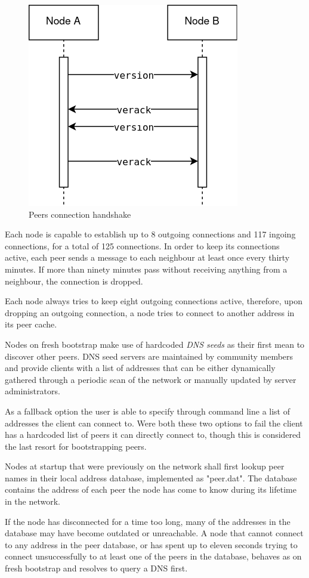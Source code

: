 \begin{figure}[h]
	\includegraphics[width=.45\textwidth]{pict/BTCconnection.png}
	\centering
	\caption{Peers connection handshake}
	\label{fig:btcconn}
\end{figure}

Each node is capable to establish up to 8 outgoing connections and 117 ingoing connections, for a total of 125 connections. In order to keep its connections active, each peer sends a message to each neighbour at least once every thirty minutes. If more than ninety minutes pass without receiving anything from a neighbour, the connection is dropped.

Each node always tries to keep eight outgoing connections active, therefore, upon dropping an outgoing connection, a node tries to connect to another address in its peer cache.\par

Nodes on fresh bootstrap make use of hardcoded \emph{DNS seeds} as their first mean to discover other peers. DNS seed servers are maintained by community members and provide clients with a list of addresses that can be either dynamically gathered through a periodic scan of the network or manually updated by server administrators.

As a fallback option the user is able to specify through command line a list of addresses the client can connect to. Were both these two options to fail the client has a hardcoded list of peers it can directly connect to, though this is considered the last resort for bootstrapping peers.\par

Nodes at startup that were previously on the network shall first lookup peer names in their local address database, implemented as "peer.dat". The database contains the address of each peer the node has come to know during its lifetime in the network.

If the node has disconnected for a time too long, many of the addresses in the database may have become outdated or unreachable. A node that cannot connect to any address in the peer database, or has spent up to eleven seconds trying to connect unsuccessfully to at least one of the peers in the database, behaves as on fresh bootstrap and resolves to query a DNS first.

